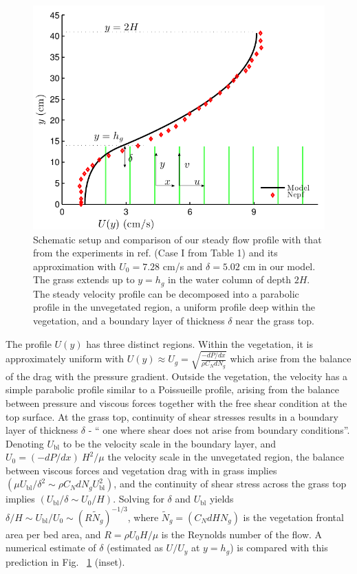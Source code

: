 \documentclass[12pt]{report}   %
\newcommand{\hg}{h_g}
\newcommand{\Rey}{{R}}
\newcommand{\Ndg}{\tilde{N}_g}
\newcommand{\ubl}{U_\text{bl}}
\begin{document}
\begin{figure}
\centerline{\includegraphics[scale=.99]{Grass_Base_Nepf} }
\caption{
Schematic setup and comparison of our steady flow profile with that from the experiments in ref. \cite{Nepf04} (Case I from Table 1) %
 and its approximation with $U_0=7.28$ cm/s and $\delta = 5.02$ cm in our model. The grass extends up to $y=\hg$ in the water column of depth $2H$. 
The steady velocity profile can be decomposed into a parabolic profile in the unvegetated region, a uniform profile deep within the vegetation, and a boundary layer of thickness $\delta$ near the grass top. 
}
\label{basicflow}
\end{figure}
The profile $U(y)$ has three distinct regions.
Within the vegetation, it is approximately uniform with $ U(y) \approx U_g = \sqrt{\frac{-dP/dx}{\rho C_N dN_g}}$ which arise from the balance of the drag with the pressure gradient. 
Outside the vegetation, the velocity has a simple parabolic profile similar to a Poissueille profile, arising from the balance between pressure and viscous forces together with the free shear condition at the top surface. 
At the grass top, continuity of shear stresses results in a boundary layer of thickness $\delta$ - `` one where shear does not arise from boundary conditions''. Denoting $\ubl$ to be the velocity scale in the boundary layer, and $U_0 = {(-dP/dx)~H^2}/{\mu}$ the velocity scale in the unvegetated region, the balance between viscous forces and vegetation drag with in grass implies $(\mu \ubl/\delta^2 \sim \rho C_N d N_g \ubl^2)$, and the continuity of shear stress across the grass top implies $(\ubl/\delta \sim U_0/H)$.
Solving for $\delta$ and $\ubl$ yields $\delta/H \sim \ubl/U_0 \sim (\Rey \Ndg )^{-1/3}$, where $\Ndg = \left(C_N d H N_g\right)$ is the vegetation frontal area per bed area, and $\Rey=\rho U_0 H/\mu$ is the Reynolds number of the flow. 
A numerical estimate of $\delta$ (estimated as $U/U_y$ at $y=\hg$) is compared with this prediction in Fig. ~\ref{basicflow} (inset).
\end{document}
